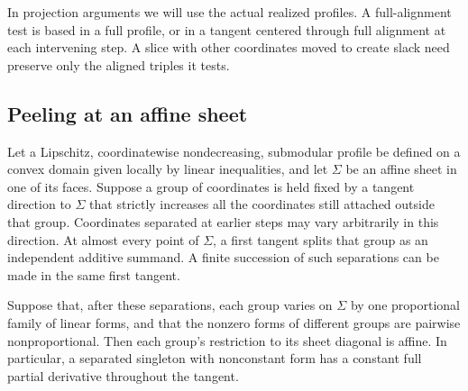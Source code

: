 In projection arguments we will use the actual realized profiles.
A full-alignment test is based in a full profile, or in a tangent
centered through full alignment at each intervening step.  A slice
with other coordinates moved to create slack need preserve only
the aligned triples it tests.

\subsection{Peeling at an affine sheet}

\begin{lemma}[Peeling]\label{ent:peeling}
Let a Lipschitz, coordinatewise nondecreasing, submodular profile be
defined on a convex domain given locally by linear inequalities,
and let $\Sigma$ be an affine sheet in one of its faces.  Suppose
a group of coordinates is held fixed by a tangent direction to
$\Sigma$ that strictly increases all the coordinates still
attached outside that group.  Coordinates separated at earlier
steps may vary arbitrarily in this direction.  At almost every
point of $\Sigma$, a first tangent splits that group as an
independent additive summand.  A finite succession of such
separations can be made in the same first tangent.

Suppose that, after these separations, each group varies on
$\Sigma$ by one proportional family of linear forms, and that the
nonzero forms of different groups are pairwise nonproportional.
Then each group's restriction to its sheet diagonal is affine.
In particular, a separated singleton with nonconstant form has a
constant full partial derivative throughout the tangent.
\end{lemma}

